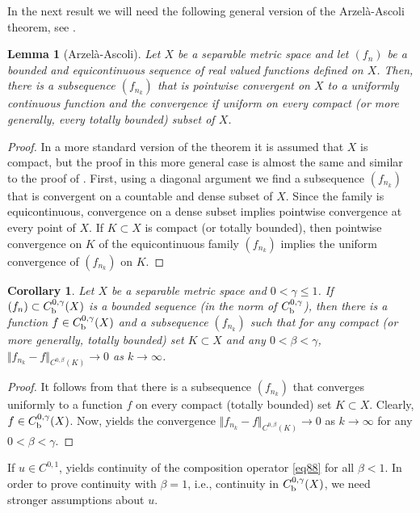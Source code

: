 \documentclass[intlimits,12pt,reqno]{amsart}
\numberwithin{equation}{section}
\newtheorem{lemma}[theorem]{Lemma}
\newtheorem{corollary}[theorem]{Corollary}
\theoremstyle{definition}
\begin{document}
In the next result we will need the following general version of the Arzel\`a-Ascoli theorem, see
\cite[Theorem~1.4.9]{papa}.
\begin{lemma}[Arzel\`a-Ascoli]
\label{T2}
Let $X$ be a separable metric space and let $(f_n)$ be a bounded and equicontinuous sequence of real valued
functions defined on $X$. Then, there is a subsequence $(f_{n_k})$ that is pointwise convergent on $X$ to a uniformly continuous function and the convergence if uniform on every compact (or more generally, every totally bounded) subset of $X$.
\end{lemma}
\begin{proof}
In a more standard version of the theorem it is assumed that $X$ is compact, but the proof in this more general case is almost the same and similar to the proof of . 
First, using a diagonal argument we find a subsequence $(f_{n_k})$ that is convergent on a countable and dense subset of $X$. Since the family is equicontinuous, convergence on a dense subset implies pointwise convergence at every point of $X$. If $K\subset X$ is compact (or totally bounded), then pointwise convergence on $K$ of the equicontinuous family $(f_{n_k})$ implies the uniform convergence of $(f_{n_k})$ on $K$.
\end{proof}
\begin{corollary}
\label{T1}
Let $X$ be a separable metric space and $0<\gamma\leq 1$. If
$(f_n)\subset C_{\rm b}^{0,\gamma}(X)$ is a bounded sequence (in the norm of $C^{0,\gamma}_{\rm b}$), then there is a function $f\in C_{\rm b}^{0,\gamma}(X)$ and a subsequence
$(f_{n_k})$ such that for any compact (or more generally, totally bounded) set $K\subset X$ and any $0<\beta<\gamma$,
$\Vert f_{n_k}-f\Vert_{C^{0,\beta}(K)}\to 0$ as $k\to\infty$.
\end{corollary}
\begin{proof}
It follows from  that there
is a subsequence $(f_{n_k})$ that converges uniformly to a function $f$ on every compact (totally bounded) set $K\subset X$. 
Clearly, $f\in C_{\rm b}^{0,\gamma}(X)$. Now,  yields the convergence
$\Vert f_{n_k}-f\Vert_{C^{0,\beta}(K)}\to 0$ as $k\to\infty$ for any $0<\beta<\gamma$.
\end{proof}

If $u\in C^{0,1}$,  yields continuity of the composition operator \eqref{eq88} for all $\beta<1$. In order to prove continuity with $\beta=1$, i.e., continuity in $C^{0,\gamma}_{\rm b}(X)$, we need stronger assumptions about $u$.
\end{document}

